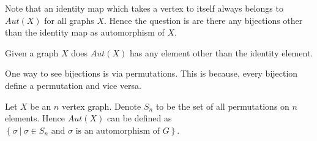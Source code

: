 Note that an identity map which takes a vertex to itself always belongs to
$Aut(X)$ for all graphs $X$. Hence the question is are there any bijections
other than the identity map as automorphism of $X$.

\begin{problem}
	Given a graph $X$ does $Aut(X)$ has any element other than the
	identity element.
\end{problem}

One way to see bijections is via permutations. This is because, every
bijection define a permutation and vice versa.

Let $X$ be an $n$ vertex graph. 
Denote $S_n$ to be the set of all permutations on $n$ elements. Hence $Aut(X)$
can be defined as $\left\{ \sigma ~|~ \sigma \in S_n \text{ and $\sigma$ is an
automorphism of } G\right\}$. 

